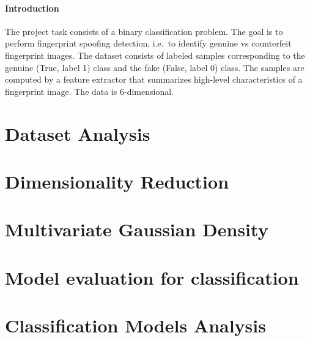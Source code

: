 \documentclass{article}
\begin{document}
    


    \paragraph{Introduction}
    The project task consists of a binary classification problem.
    The goal is to perform fingerprint spoofing detection, i.e.\ to identify genuine vs counterfeit fingerprint images.
    The dataset consists of labeled samples corresponding to the genuine (True, label 1) class and the fake (False, label 0) class.
    The samples are computed by a feature extractor that summarizes high-level characteristics of a fingerprint
    image.
    The data is 6-dimensional.



    \section{Dataset Analysis}
    \label{sec:datasetAnalysis}
    




    \section{Dimensionality Reduction}
    \label{sec:dimensionalityReduction}
    



    \section{Multivariate Gaussian Density}
    \label{sec:multivariateGaussianDensity}
    



    \section{Model evaluation for classification}
    \label{sec:modelEvalution}
    


    \section{Classification Models Analysis}
    \label{sec:classificationModels}
    
\end{document}
